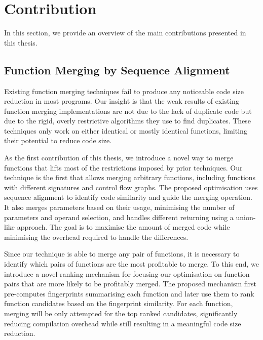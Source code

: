 \section{Contribution}

In this section, we provide an overview of the main contributions presented in this thesis.

\subsection{Function Merging by Sequence Alignment}


Existing function merging techniques fail to produce any noticeable code size reduction in most programs.
Our insight is that the weak results of existing function merging implementations are not due to the lack of duplicate code but due to the rigid, overly restrictive algorithms they use to find duplicates.
These techniques only work on either identical or mostly identical functions, limiting their potential to reduce code size.

As the first contribution of this thesis, we introduce a novel way to merge functions that lifts most of the restrictions imposed by prior techniques.
Our technique is the first that allows merging arbitrary functions, including functions with different signatures and control flow graphs.
The proposed optimisation uses sequence alignment to identify code similarity and guide the merging operation.
It also merges parameters based on their usage, minimising the number of parameters and operand selection, and handles different returning using a union-like approach.
The goal is to maximise the amount of merged code while minimising the overhead required to handle the differences.

Since our technique is able to merge any pair of functions, it is necessary to identify which pairs of functions are the most profitable to merge.
To this end, we introduce a novel ranking mechanism for focusing our optimisation on function pairs that are more likely to be profitably merged.
The proposed mechanism first pre-computes fingerprints summarising each function and later use them to rank function candidates based on the fingerprint similarity.
For each function, merging will be only attempted for the top ranked candidates, significantly reducing compilation overhead while still resulting in a meaningful code size reduction.

